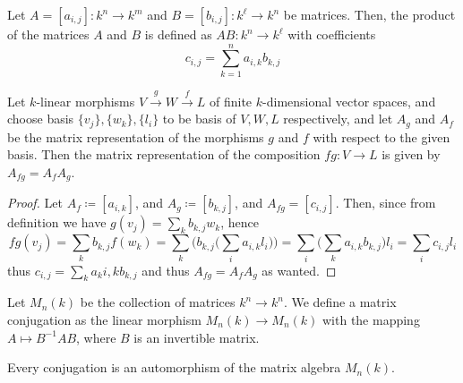 \begin{definition}\label{def: matrix multiplication}
  Let \(A = [a_{i,j}] : k^n \to k^m\) and \(B = [b_{i, j}] : k^\ell \to k^n\) be
  matrices. Then, the product of the matrices \(A\) and \(B\) is defined as
  \(AB : k^n \to k^\ell\) with coefficients
  \[
    c_{i, j} = \sum_{k=1}^n a_{i, k} b_{k, j}
  \]
\end{definition}

\begin{proposition}
  \label{prop: matrix of the composition}
  Let \(k\)-linear morphisms \(V \xrightarrow g W \xrightarrow f L\) of finite
  \(k\)-dimensional vector spaces, and choose basis \(\{v_j\}, \{w_k\}, \{l_i\}\)
  to be basis of \(V, W, L\) respectively, and let \(A_g\) and \(A_f\) be the
  matrix representation of the morphisms \(g\) and \(f\) with respect to the
  given basis. Then the matrix representation of the composition \(f  g: V
  \to L\) is given by \(A_{f  g} = A_f A_g\).
\end{proposition}

\begin{proof}
  Let \(A_f \coloneq [a_{i, k}]\), and \(A_g \coloneq [b_{k, j}]\), and \(A_{f  g} =
  [c_{i, j}]\). Then, since from definition we have \(g(v_j) = \sum_k b_{k, j}
  w_k\), hence
  \[
    f  g(v_j) =
    \sum_k b_{k, j} f(w_k) =
    \sum_k \bigg( b_{k, j} \bigg( \sum_i a_{i, k} l_i \bigg) \bigg)
    = \sum_i \bigg( \sum_k a_{i, k} b_{k, j} \bigg) l_i
    = \sum_i c_{i, j} l_i
  \]
  thus \(c_{i, j} = \sum_k a_k{i, k} b_{k, j}\) and thus \(A_{f  g} = A_f
  A_g\) as wanted.
\end{proof}

\begin{definition}[Conjugation]\label{def: matrix conjugation}
  Let \(M_n(k)\) be the collection of matrices \(k^n \to k^n\). We define a
  matrix conjugation as the linear morphism \(M_n(k) \to M_n(k)\) with the
  mapping \(A \mapsto B^{-1} A B\), where \(B\) is an invertible matrix.
\end{definition}

\begin{proposition}
  Every conjugation is an automorphism of the matrix algebra \(M_n(k)\).
\end{proposition}
